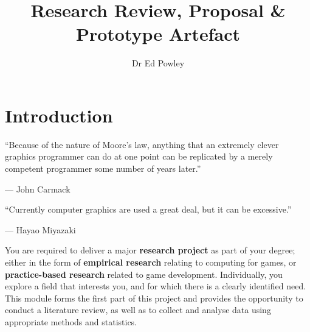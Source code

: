\documentclass{../fal_assignment}
\title{Research Review, Proposal \& Prototype Artefact}
\author{Dr Ed Powley}
\begin{document}
\maketitle

\section*{Introduction}

\begin{marginquote}
``Because of the nature of Moore's law, anything that an extremely clever graphics programmer can do at one point can be replicated by a merely competent programmer some number of years later.''

--- John Carmack

    \marginquoterule

``Currently computer graphics are used a great deal, but it can be excessive.''

--- Hayao Miyazaki
\end{marginquote}

You are required to deliver a major \textbf{research project} as part of your degree; either in the form of \textbf{empirical research} relating to computing for games, or \textbf{practice-based research} related to game development. Individually, you explore a field that interests you, and for which there is a clearly identified need. This module forms the first part of this project and provides the opportunity to conduct a literature review, as well as to collect and analyse data using appropriate methods and statistics.
\end{document}
